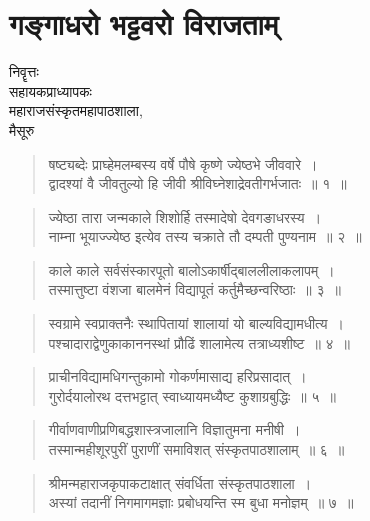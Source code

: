 {\fontsize{15}{17}\selectfont
\chapter{गङ्गाधरो भट्टवरो विराजताम्}

\begin{center}
\smallskip

निवॄत्तः\\ 
सहायकप्राध्यापकः\\ 
महाराजसंस्कृतमहापाठशाला,\\ 
मैसूरु
\addrule
\end{center}

\begin{verse}
षष्ट्यब्देः प्राघ्हेमलम्बस्य वर्षे पौषे कृष्णे ज्येष्ठभे जीववारे~।\\
द्वादश्यां वै जीवतुल्यो हि जीवी श्रीविघ्नेशाद्रेवतीगर्भजातः~॥ १~॥
\end{verse}

\begin{verse}
ज्येष्ठा तारा जन्मकाले शिशोर्हि तस्मादेषो देवगङाधरस्य~।\\
नाम्ना भूयाज्ज्येष्ठ इत्येव तस्य चक्राते तौ दम्पती पुण्यनाम~॥ २~॥
\end{verse}

\begin{verse}
काले काले सर्वसंस्कारपूतो बालोऽकार्षीद्बाललीलाकलापम्~।\\
तस्मात्तुष्टा वंशजा बालमेनं विद्यापूतं कर्तुमैच्छन्वरिष्ठाः~॥ ३~॥
\end{verse}

\begin{verse}
स्वग्रामे स्वप्राक्तनैः स्थापितायां शालायां यो बाल्यविद्यामधीत्य~।\\
पश्चादाराद्वेणुकाकाननस्थां प्रौढिं शालामेत्य तत्राध्यशीष्ट~॥ ४~॥
\end{verse}

\begin{verse}
प्राचीनविद्यामधिगन्तुकामो गोकर्णमासाद्य हरिप्रसादात्~।\\
गुरोर्दयालोरथ दत्तभट्टात् स्वाध्यायमध्यैष्ट कुशाग्रबुद्धिः~॥ ५~॥
\end{verse}

\begin{verse}
गीर्वाणवाणीप्रणिबद्धशास्त्रजालानि विज्ञातुमना मनीषी~।\\
तस्मान्महीशूरपुरीं पुराणीं समाविशत् संस्कृतपाठशालाम्~॥ ६~॥
\end{verse}

\begin{verse}
श्रीमन्महाराजकृपाकटाक्षात् संवर्धिता संस्कृतपाठशाला~।\\
अस्यां तदानीं निगमागमज्ञाः प्रबोधयन्ति स्म बुधा मनोज्ञम्~॥ ७~॥
\end{verse}

}
